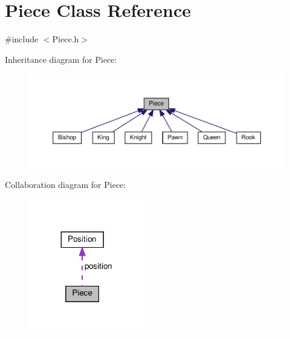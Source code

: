 \hypertarget{class_piece}{}\section{Piece Class Reference}
\label{class_piece}


{\ttfamily \#include $<$Piece.\+h$>$}



Inheritance diagram for Piece\+:\nopagebreak
\begin{figure}[H]
\begin{center}
\leavevmode
\includegraphics[width=350pt]{class_piece__inherit__graph}
\end{center}
\end{figure}


Collaboration diagram for Piece\+:\nopagebreak
\begin{figure}[H]
\begin{center}
\leavevmode
\includegraphics[width=143pt]{class_piece__coll__graph}
\end{center}
\end{figure}
